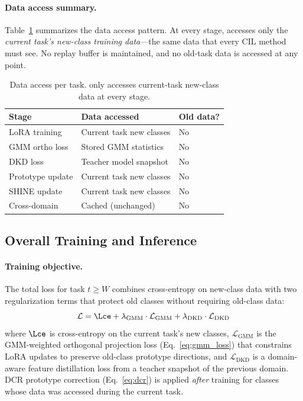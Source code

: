 \paragraph{Data access summary.}
Table~\ref{tab:data_access} summarizes the data access pattern.
At every stage, \methodname{} accesses only the \emph{current task's new-class training data}---the same data that every CIL method must see.
No replay buffer is maintained, and no old-task data is accessed at any point.

\begin{table}[t]
\centering
\caption{Data access per task. \methodname{} only accesses current-task new-class data at every stage.}
\label{tab:data_access}
\small
\begin{tabular}{lll}
\toprule
\textbf{Stage} & \textbf{Data accessed} & \textbf{Old data?} \\
\midrule
LoRA training & Current task new classes & No \\
GMM ortho loss & Stored GMM statistics & No \\
DKD loss & Teacher model snapshot & No \\
Prototype update & Current task new classes & No \\
SHINE update & Current task new classes & No \\
Cross-domain & Cached (unchanged) & No \\
\bottomrule
\end{tabular}
\end{table}

\subsection{Overall Training and Inference}
\label{sec:overall}

\paragraph{Training objective.}
The total loss for task $t \geq W$ combines cross-entropy on new-class data with two regularization terms that protect old classes without requiring old-class data:
\begin{equation}
    \mathcal{L} = \Lce + \lambda_{\mathrm{GMM}} \cdot \mathcal{L}_{\mathrm{GMM}} + \lambda_{\mathrm{DKD}} \cdot \mathcal{L}_{\mathrm{DKD}}
\label{eq:total_loss}
\end{equation}
where $\Lce$ is cross-entropy on the current task's new classes, $\mathcal{L}_{\mathrm{GMM}}$ is the GMM-weighted orthogonal projection loss (Eq.~\ref{eq:gmm_loss}) that constrains LoRA updates to preserve old-class prototype directions, and $\mathcal{L}_{\mathrm{DKD}}$ is a domain-aware feature distillation loss from a teacher snapshot of the previous domain.
DCR prototype correction (Eq.~\ref{eq:dcr}) is applied \emph{after} training for classes whose data was accessed during the current task.

